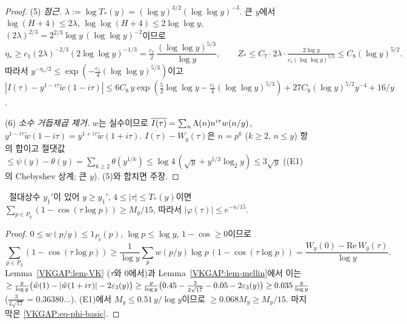 \begin{proof}
(5) \emph{점근.} $\lambda:=\log T_*(y)=(\log y)^{3/2}(\log\log y)^{-3}$. 큰 $y$에서
$\log(H+4)\le2\lambda$, $\log\log(H+4)\le2\log\log y$, $(2\lambda)^{2/3}=2^{2/3}\log y\,(\log\log y)^{-2}$이므로
\[
\eta_*\ge c_1(2\lambda)^{-2/3}(2\log\log y)^{-1/3}=\tfrac{c_1}{2}\,\frac{(\log\log y)^{5/3}}{\log y},\qquad
Z_*\le C_7\cdot 2\lambda\cdot\tfrac{2\log y}{c_1(\log\log y)^{5/3}}\le C_8(\log y)^{5/2}.
\]
따라서 $y^{-\eta_*/2}\le\exp(-\tfrac{c_1}{4}(\log\log y)^{5/3})$이고
$|I(\tau)-y^{1-i\tau}\tilde w(1-i\tau)|\le 6C_8\,y\exp(\tfrac52\log\log y-\tfrac{c_1}4(\log\log y)^{5/3})+27C_8(\log y)^{5/2}y^{-4}+16/y$.

(6) \emph{소수 거듭제곱 제거.} $w$는 실수이므로 $\overline{I(\tau)}=\sum_n\Lambda(n)n^{i\tau}w(n/y)$, $\overline{y^{1-i\tau}\tilde w(1-i\tau)}=y^{1+i\tau}\tilde w(1+i\tau)$.
$\overline{I(\tau)}-W_y(\tau)$은 $n=p^k$ ($k\ge2$, $n\le y$) 항의 합이고 절댓값 $\le\psi(y)-\theta(y)=\sum_{k\ge2}\theta(y^{1/k})
\le\log4\,(\sqrt y+y^{1/3}\log_2y)\le3\sqrt y$ ((E1)의 Chebyshev 상계; 큰 $y$).
(5)와 합치면 주장.
\end{proof}

\begin{corollary}\label{VKGAP:cor-NRuncond}
\ 절대상수 $y_1'$이 있어 $y\ge y_1'$, $4\le|\tau|\le T_*(y)$이면
$\sum_{p\in P_y}(1-\cos(\tau\log p))\ge M_y/15$, 따라서 $|\varphi(\tau)|\le e^{-n/15}$.
\end{corollary}
\begin{proof}
$0\le w(p/y)\le 1_{P_y}(p)$, $\log p\le\log y$, $1-\cos\ge0$이므로
\[
\sum_{p\in P_y}(1-\cos(\tau\log p))\ge\frac1{\log y}\sum_pw(p/y)\log p\,(1-\cos(\tau\log p))=\frac{W_y(0)-\mathrm{Re}\,W_y(\tau)}{\log y}.
\]
Lemma~\ref{VKGAP:lem-VK} ($\tau$와 $0$에서)과 Lemma~\ref{VKGAP:lem-mellin}에서 이는
$\ge\frac{y}{\log y}\big(\tilde w(1)-|\tilde w(1+i\tau)|-2\varepsilon_3(y)\big)\ge\frac{y}{\log y}\big(0.45-\tfrac{3}{2\sqrt{17}}-0.05-2\varepsilon_3(y)\big)
\ge 0.035\,\frac{y}{\log y}$ ($\frac{3}{2\sqrt{17}}=0.36380\ldots$).
(E1)에서 $M_y\le0.51\,y/\log y$이므로 $\ge0.068M_y\ge M_y/15$. 마지막은 \eqref{VKGAP:eq-phi-basic}.
\end{proof}

